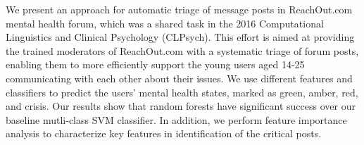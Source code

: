 We present an approach for automatic triage of message posts in ReachOut.com mental health forum, which was a shared task in the 2016 Computational Linguistics and Clinical Psychology (CLPsych). This effort is aimed at providing the trained moderators of ReachOut.com  with a systematic triage of forum posts, enabling them to more efficiently support the young users aged 14-25 communicating with each other about their issues. We use different features and classifiers to predict the users' mental health states, marked as green, amber, red, and crisis. Our results show that random forests have significant success over our baseline mutli-class SVM classifier. In addition, we perform feature importance analysis to characterize key features in identification of the critical posts.
